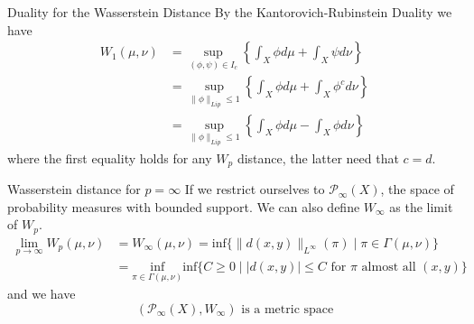 \documentclass[10pt]{beamer}
\theoremstyle{reminder}
\begin{document}
\begin{frame}{Duality for the Wasserstein Distance}
    By the Kantorovich-Rubinstein Duality we have \begin{align*} W_1(\mu,\nu) &= \sup_{(\phi,\psi) \in I_c} \left\{ \int_X \phi d\mu + \int_X \psi d\nu \right\} \\ &= \sup_{\|\phi\|_{Lip} \leq 1} \left\{\int_X \phi d\mu + \int_X \phi^c d\nu  \right\} 
       \\ &= \sup_{\|\phi\|_{Lip} \leq 1} \left\{\int_X \phi d\mu - \int_X \phi d\nu  \right\} \end{align*}
       where the first equality holds for any $W_p$ distance, the latter need that $c = d$.
\end{frame}


\begin{frame}{Wasserstein distance for $p = \infty$}
    If we restrict ourselves to $\mathcal{P}_\infty(X)$, the space of probability measures with bounded support. We can also define $W_\infty$ as the limit of $W_p$.
    \begin{align*}\lim_{p \to \infty} W_p(\mu,\nu) &= W_\infty(\mu,\nu) =\text{inf}\{\|d(x,y)\|_{L^\infty}(\pi) \mid \pi \in \Gamma(\mu,\nu)\} \\
    &= \underset{\pi \in \Gamma(\mu,\nu)}{\text{inf}}\text{inf}\{C \geq 0 \mid |d(x,y)| \leq C \text{ for } \pi \text{ almost all } (x,y)\} \end{align*} 
    and we have $$(\mathcal{P}_\infty(X), W_\infty) \text{ is a metric space}$$ 
\end{frame}



\end{document}
